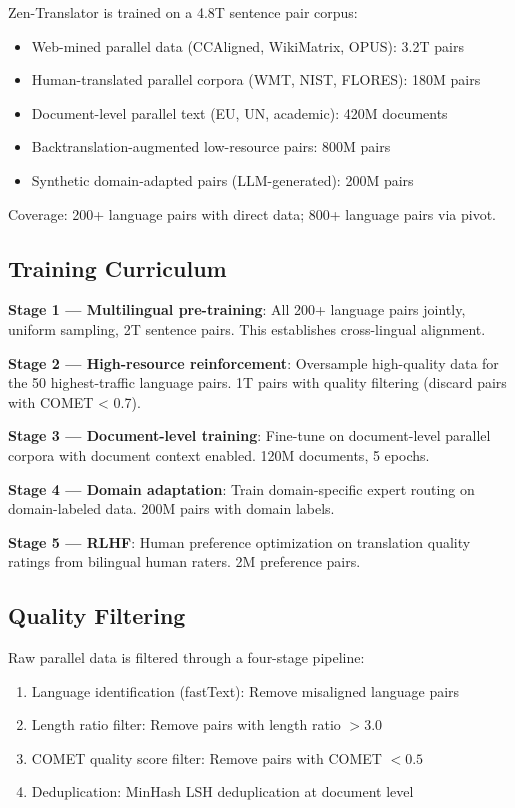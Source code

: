 \documentclass[11pt,a4paper]{article}
\begin{document}
Zen-Translator is trained on a 4.8T sentence pair corpus:

\begin{itemize}
\item Web-mined parallel data (CCAligned, WikiMatrix, OPUS): 3.2T pairs
\item Human-translated parallel corpora (WMT, NIST, FLORES): 180M pairs
\item Document-level parallel text (EU, UN, academic): 420M documents
\item Backtranslation-augmented low-resource pairs: 800M pairs
\item Synthetic domain-adapted pairs (LLM-generated): 200M pairs
\end{itemize}

Coverage: 200+ language pairs with direct data; 800+ language pairs via pivot.

\subsection{Training Curriculum}

\textbf{Stage 1 --- Multilingual pre-training}: All 200+ language pairs jointly,
uniform sampling, 2T sentence pairs. This establishes cross-lingual alignment.

\textbf{Stage 2 --- High-resource reinforcement}: Oversample high-quality data
for the 50 highest-traffic language pairs. 1T pairs with quality filtering
(discard pairs with COMET < 0.7).

\textbf{Stage 3 --- Document-level training}: Fine-tune on document-level parallel
corpora with document context enabled. 120M documents, 5 epochs.

\textbf{Stage 4 --- Domain adaptation}: Train domain-specific expert routing
on domain-labeled data. 200M pairs with domain labels.

\textbf{Stage 5 --- RLHF}: Human preference optimization on translation quality
ratings from bilingual human raters. 2M preference pairs.

\subsection{Quality Filtering}

Raw parallel data is filtered through a four-stage pipeline:
\begin{enumerate}
\item Language identification (fastText): Remove misaligned language pairs
\item Length ratio filter: Remove pairs with length ratio $> 3.0$
\item COMET quality score filter: Remove pairs with COMET $< 0.5$
\item Deduplication: MinHash LSH deduplication at document level
\end{enumerate}
\end{document}
